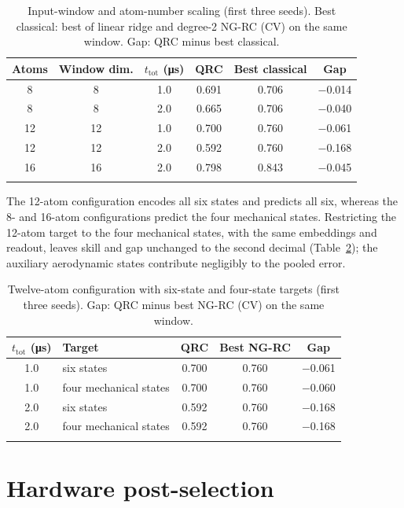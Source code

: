 \documentclass[pdflatex,sn-mathphys-num]{sn-jnl}
\begin{document}
\begin{table}[htb]
\caption{Input-window and atom-number scaling (first three seeds). Best classical: best of linear ridge and degree-2 NG-RC (CV) on the same window. Gap: QRC minus best classical.}\label{tab:s4a}
\begin{tabular}{@{}cccccc@{}}
\toprule
Atoms & Window dim. & $t_{\mathrm{tot}}$ (\si{\micro\second}) & QRC & Best classical & Gap \\
\midrule
8 & 8 & 1.0 & 0.691 & 0.706 & $-$0.014 \\
8 & 8 & 2.0 & 0.665 & 0.706 & $-$0.040 \\
12 & 12 & 1.0 & 0.700 & 0.760 & $-$0.061 \\
12 & 12 & 2.0 & 0.592 & 0.760 & $-$0.168 \\
16 & 16 & 2.0 & 0.798 & 0.843 & $-$0.045 \\
\botrule
\end{tabular}
\end{table}

The 12-atom configuration encodes all six states and predicts all six, whereas the 8- and 16-atom configurations predict the four mechanical states. Restricting the 12-atom target to the four mechanical states, with the same embeddings and readout, leaves skill and gap unchanged to the second decimal (Table~\ref{tab:s4}); the auxiliary aerodynamic states contribute negligibly to the pooled error.

\begin{table}[htb]
\caption{Twelve-atom configuration with six-state and four-state targets (first three seeds). Gap: QRC minus best NG-RC (CV) on the same window.}\label{tab:s4}
\begin{tabular}{@{}clccc@{}}
\toprule
$t_{\mathrm{tot}}$ (\si{\micro\second}) & Target & QRC & Best NG-RC & Gap \\
\midrule
1.0 & six states & 0.700 & 0.760 & $-$0.061 \\
1.0 & four mechanical states & 0.700 & 0.760 & $-$0.060 \\
2.0 & six states & 0.592 & 0.760 & $-$0.168 \\
2.0 & four mechanical states & 0.592 & 0.760 & $-$0.168 \\
\botrule
\end{tabular}
\end{table}

\section{Hardware post-selection}\label{sec:s5}
\end{document}
